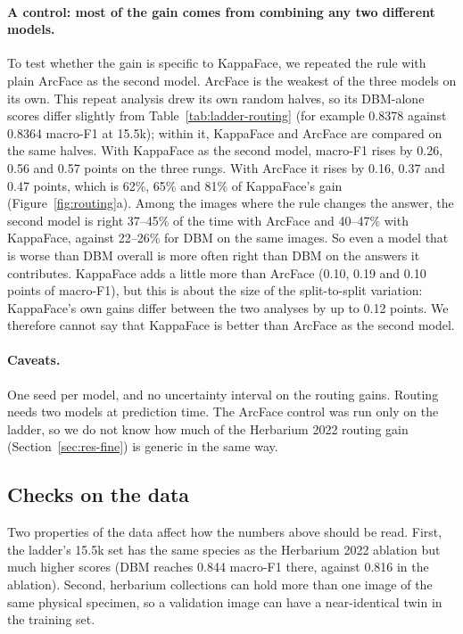 \documentclass[11pt]{article}
\begin{document}
\paragraph{A control: most of the gain comes from combining any two different models.}
To test whether the gain is specific to KappaFace, we repeated the rule with plain
ArcFace as the second model. ArcFace is the weakest of the three models on its own. This
repeat analysis drew its own random halves, so its DBM-alone scores differ slightly from
Table~\ref{tab:ladder-routing} (for example 0.8378 against 0.8364 macro-F1 at 15.5k);
within it, KappaFace and ArcFace are compared on the same halves. With KappaFace as the
second model, macro-F1 rises by 0.26, 0.56 and 0.57 points on the three rungs. With ArcFace
it rises by 0.16, 0.37 and 0.47 points, which is 62\%, 65\% and 81\% of KappaFace's gain
(Figure~\ref{fig:routing}a). Among the images where the rule changes the answer, the
second model is right 37--45\% of the time with ArcFace and 40--47\% with KappaFace,
against 22--26\% for DBM on the same images. So even a model that is worse than DBM overall
is more often right than DBM on the answers it contributes. KappaFace adds a little more
than ArcFace (0.10, 0.19 and 0.10 points of macro-F1), but this is about the size of the
split-to-split variation: KappaFace's own gains differ between the two analyses by up to
0.12 points. We therefore cannot say that KappaFace is better than ArcFace as the second
model.

\paragraph{Caveats.} One seed per model, and no uncertainty interval on the routing
gains. Routing needs two models at prediction time. The ArcFace control was run only on
the ladder, so we do not know how much of the Herbarium 2022 routing gain
(Section~\ref{sec:res-fine}) is generic in the same way.

\subsection{Checks on the data}
\label{sec:res-data}

Two properties of the data affect how the numbers above should be read. First, the ladder's
15.5k set has the same species as the Herbarium 2022 ablation but much higher scores (DBM
reaches 0.844 macro-F1 there, against 0.816 in the ablation). Second, herbarium collections
can hold more than one image of the same physical specimen, so a validation image can have
a near-identical twin in the training set.
\end{document}
